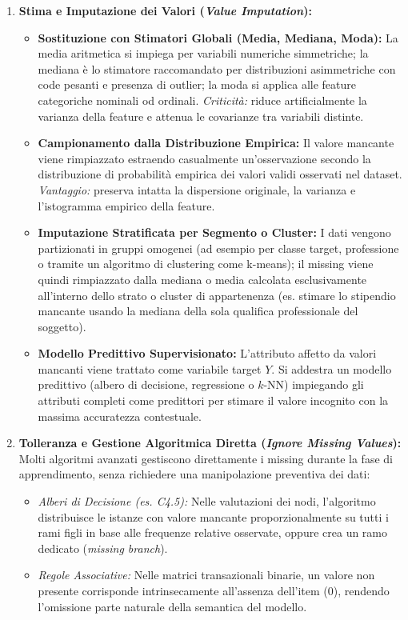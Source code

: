 \begin{enumerate}
    \item \textbf{Stima e Imputazione dei Valori (\textit{Value Imputation}):}
    \begin{itemize}
        \item \textbf{Sostituzione con Stimatori Globali (Media, Mediana, Moda):}
        La media aritmetica si impiega per variabili numeriche simmetriche; la mediana è lo stimatore raccomandato per distribuzioni asimmetriche con code pesanti e presenza di outlier; la moda si applica alle feature categoriche nominali od ordinali. \textit{Criticità:} riduce artificialmente la varianza della feature e attenua le covarianze tra variabili distinte.
        \item \textbf{Campionamento dalla Distribuzione Empirica:}
        Il valore mancante viene rimpiazzato estraendo casualmente un'osservazione secondo la distribuzione di probabilità empirica dei valori validi osservati nel dataset. \textit{Vantaggio:} preserva intatta la dispersione originale, la varianza e l'istogramma empirico della feature.
        \item \textbf{Imputazione Stratificata per Segmento o Cluster:}
        I dati vengono partizionati in gruppi omogenei (ad esempio per classe target, professione o tramite un algoritmo di clustering come k-means); il missing viene quindi rimpiazzato dalla mediana o media calcolata esclusivamente all'interno dello strato o cluster di appartenenza (es. stimare lo stipendio mancante usando la mediana della sola qualifica professionale del soggetto).
        \item \textbf{Modello Predittivo Supervisionato:}
        L'attributo affetto da valori mancanti viene trattato come variabile target $Y$. Si addestra un modello predittivo (albero di decisione, regressione o $k$-NN) impiegando gli attributi completi come predittori per stimare il valore incognito con la massima accuratezza contestuale.
    \end{itemize}

    \item \textbf{Tolleranza e Gestione Algoritmica Diretta (\textit{Ignore Missing Values}):}
    Molti algoritmi avanzati gestiscono direttamente i missing durante la fase di apprendimento, senza richiedere una manipolazione preventiva dei dati:
    \begin{itemize}
        \item \textit{Alberi di Decisione (es. C4.5):} Nelle valutazioni dei nodi, l'algoritmo distribuisce le istanze con valore mancante proporzionalmente su tutti i rami figli in base alle frequenze relative osservate, oppure crea un ramo dedicato (\textit{missing branch}).
        \item \textit{Regole Associative:} Nelle matrici transazionali binarie, un valore non presente corrisponde intrinsecamente all'assenza dell'item ($0$), rendendo l'omissione parte naturale della semantica del modello.
    \end{itemize}
\end{enumerate}


